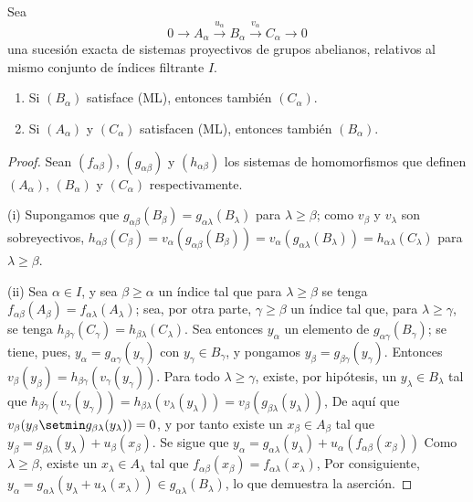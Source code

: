 \begin{proposition}[13.2.1]
\label{0.13.2.1}
\label{0.13.2.1-fr}
Sea
\[
0\longrightarrow A_\alpha\xrightarrow{u_\alpha}B_\alpha
\xrightarrow{v_\alpha}C_\alpha\longrightarrow0
\]
una sucesión exacta de sistemas proyectivos de grupos abelianos, relativos
al mismo conjunto de índices filtrante $I$.
\begin{enumerate}
  \item[{\rm(i)}]
  Si $(B_\alpha)$ satisface {\rm(ML)}, entonces también $(C_\alpha)$.
  \item[{\rm(ii)}]
  Si $(A_\alpha)$ y $(C_\alpha)$ satisfacen {\rm(ML)}, entonces también
  $(B_\alpha)$.
\end{enumerate}
\end{proposition}

\begin{proof}
Sean $(f_{\alpha\beta})$, $(g_{\alpha\beta})$ y
$(h_{\alpha\beta})$ los sistemas de homomorfismos que definen
$(A_\alpha)$, $(B_\alpha)$ y $(C_\alpha)$ respectivamente.

(i) Supongamos que $g_{\alpha\beta}(B_\beta)=g_{\alpha\lambda}(B_\lambda)$ para $\lambda\geq\beta$; como $v_\beta$ y $v_\lambda$ son sobreyectivos,
$h_{\alpha\beta}(C_\beta)=v_\alpha(g_{\alpha\beta}(B_\beta))=v_\alpha(g_{\alpha\lambda}(B_\lambda))=h_{\alpha\lambda}(C_\lambda)$
para $\lambda\geq\beta$.

(ii) Sea $\alpha\in I$, y sea $\beta\geq\alpha$ un índice tal que para $\lambda\geq\beta$ se tenga $f_{\alpha\beta}(A_\beta)=f_{\alpha\lambda}(A_\lambda)$; sea, por otra parte, $\gamma\geq\beta$ un índice tal que, para $\lambda\geq\gamma$, se tenga $h_{\beta\gamma}(C_\gamma)=h_{\beta\lambda}(C_\lambda)$. Sea entonces $y_\alpha$ un elemento de $g_{\alpha\gamma}(B_\gamma)$; se tiene, pues,
$y_\alpha=g_{\alpha\gamma}(y_\gamma)$ con $y_\gamma\in B_\gamma$,
y pongamos $y_\beta=g_{\beta\gamma}(y_\gamma)$.
Entonces
$v_\beta(y_\beta)=h_{\beta\gamma}(v_\gamma(y_\gamma))$.
Para todo $\lambda\geq\gamma$, existe, por hipótesis, un
$y_\lambda\in B_\lambda$ tal que
$h_{\beta\gamma}(v_\gamma(y_\gamma))
=h_{\beta\lambda}(v_\lambda(y_\lambda))
=v_\beta(g_{\beta\lambda}(y_\lambda))$,
De aquí que
$v_\beta(y_\beta\setmin g_{\beta\lambda}(y_\lambda))=0$, y por tanto
existe un $x_\beta\in A_\beta$
tal que
$y_\beta=g_{\beta\lambda}(y_\lambda)+u_\beta(x_\beta)$.
Se sigue que
$y_\alpha=g_{\alpha\lambda}(y_\lambda)+u_\alpha(f_{\alpha\beta}(x_\beta))$
Como $\lambda\geq\beta$, existe un $x_\lambda\in A_\lambda$ tal
que
$f_{\alpha\beta}(x_\beta)=f_{\alpha\lambda}(x_\lambda)$,
Por consiguiente,
$y_\alpha=g_{\alpha\lambda}(y_\lambda+u_\lambda(x_\lambda))\in g_{\alpha\lambda}(B_\lambda)$,
lo que demuestra la aserción.
\end{proof}

